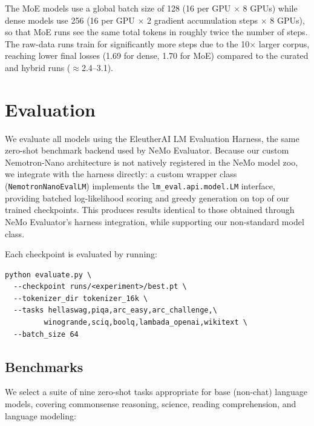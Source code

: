 The MoE models use a global batch size of 128 (16 per GPU $\times$ 8 GPUs)
while dense models use 256 (16 per GPU $\times$ 2 gradient accumulation
steps $\times$ 8 GPUs), so that MoE runs see the same total tokens in
roughly twice the number of steps.
The raw-data runs train for significantly more steps due to the
10$\times$ larger corpus, reaching lower final losses (1.69 for dense,
1.70 for MoE) compared to the curated and hybrid runs ($\approx$2.4--3.1).


\section{Evaluation}
\label{sec:evaluation}

We evaluate all models using the EleutherAI LM Evaluation Harness, the
same zero-shot benchmark backend used by NeMo Evaluator.  Because our
custom Nemotron-Nano architecture is not natively registered in the NeMo
model zoo, we integrate with the harness directly: a custom wrapper class
(\texttt{NemotronNanoEvalLM}) implements the \texttt{lm\_eval.api.model.LM}
interface, providing batched log-likelihood scoring and greedy generation
on top of our trained checkpoints.  This produces results identical to
those obtained through NeMo Evaluator's harness integration, while
supporting our non-standard model class.

Each checkpoint is evaluated by running:

\begin{verbatim}
python evaluate.py \
  --checkpoint runs/<experiment>/best.pt \
  --tokenizer_dir tokenizer_16k \
  --tasks hellaswag,piqa,arc_easy,arc_challenge,\
         winogrande,sciq,boolq,lambada_openai,wikitext \
  --batch_size 64
\end{verbatim}

\subsection{Benchmarks}

We select a suite of nine zero-shot tasks appropriate for base (non-chat)
language models, covering commonsense reasoning, science, reading
comprehension, and language modeling:

